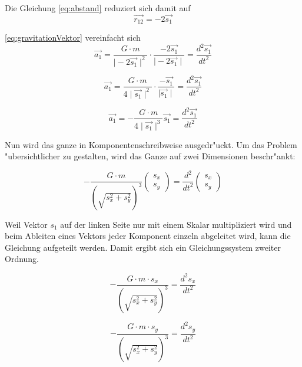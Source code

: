 \begin{refsection}
Die Gleichung \ref{eq:abstand} reduziert sich damit auf
\begin{equation}
\vec{r_{12}}= -2\vec{s_1}
\end{equation}

\ref{eq:gravitationVektor} vereinfacht sich 
\begin{equation}
\vec{a_1} =\frac{G \cdot m}{\mid -2\vec{s_{1}}\mid ^2}\cdot \frac{-2\vec{s_{1}}}{\mid -2\vec{s_{1}}\mid}=  \frac{d^2 \vec{s_1}}{dt^2}
\end{equation}

\begin{equation}
\vec{a_1} =\frac{G \cdot m}{4\mid \vec{s_{1}}\mid ^2}\cdot \frac{-\vec{s_{1}}}{\mid \vec{s_{1}}\mid}=  \frac{d^2 \vec{s_1}}{dt^2}
\end{equation}

\begin{equation}
\vec{a_1} =-\frac{G \cdot m}{4\mid \vec{s_{1}}\mid ^3}{\vec{s_{1}}}= \frac{d^2 \vec{s_1}}{dt^2}
\end{equation}


Nun wird das ganze in Komponentenschreibweise ausgedr"uckt.
Um das Problem "ubersichtlicher zu gestalten, wird das Ganze auf zwei Dimensionen beschr"ankt:

\begin{equation}
-\frac{G \cdot m}{(\sqrt{s_x^2 + s_y^2})^3}
\begin{pmatrix}
s_x \\ s_y
\end{pmatrix}
=\frac{d^2}{dt^2}
\begin{pmatrix}
s_x \\ s_y
\end{pmatrix}
\end{equation}

Weil Vektor $s_1$ auf der linken Seite nur mit einem Skalar multipliziert wird und beim Ableiten eines Vektors jeder Komponent einzeln abgeleitet wird, kann die Gleichung aufgeteilt werden.
Damit ergibt sich ein Gleichungssystem zweiter Ordnung.

\begin{equation} \label{eq:kompSchreibwEins}
-\frac{G \cdot m \cdot s_x}{(\sqrt{s_x^2 + s_y^2})^3} = \frac{d^2s_x}{dt^2}
\end{equation}

\begin{equation} \label{eq:kompSchreibwZwei}
-\frac{G \cdot m \cdot s_y}{(\sqrt{s_x^2 + s_y^2})^3} = \frac{d^2s_y}{dt^2}
\end{equation}


\end{refsection}
